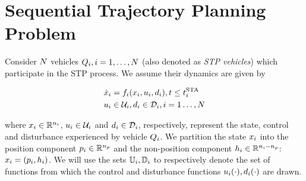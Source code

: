 \section{Sequential Trajectory Planning Problem \label{sec:formulation}}
Consider $N$ vehicles $Q_i, i = 1, \ldots, N$ (also denoted as \textit{STP vehicles}) which participate in the STP process. We assume their dynamics are given by 

\begin{equation}
\label{eq:dyn}
\begin{aligned}
\dot\state_i &= \fdyn_i(\state_i, \ctrl_i, \dstb_i), t \le \sta_i \\
\ctrl_i &\in \cset_i, \dstb_i \in \dset_i, i = 1 \ldots, \N
\end{aligned}
\end{equation}

\noindent where $x_i \in \mathbb{R}^{n_i}$, $u_i \in \mathcal{U}_i$ and $d_i \in \mathcal{D}_i$, respectively, represent the state, control and disturbance experienced by vehicle $Q_i$. We partition the state $x_i$ into the position component $p_i \in \mathbb{R}^{n_p}$ and the non-position component $h_i \in \mathbb{R}^{n_i - n_p}$: $x_i = (p_i, h_i)$. %
We will use the sets $\mathbb{U}_i, \mathbb{D}_i$ to respectively denote the set of functions from which the control and disturbance functions $u_i(\cdot), d_i(\cdot)$ are drawn.


